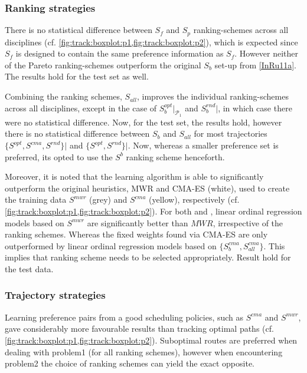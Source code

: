 \subsubsection{Ranking strategies}
There is no statistical difference between $S_f$ and $S_p$ ranking-schemes 
across all disciplines (cf. \cref{fig:track:boxplot:p1,fig:track:boxplot:p2}), 
which is expected since $S_f$ is designed to contain the same preference 
information as $S_f$. However neither of the Pareto ranking-schemes outperform 
the original $S_b$ set-up from \cref{InRu11a}. The results hold for the test 
set as well. 

Combining the ranking schemes, $S_{all}$, improves the individual ranking-schemes across all disciplines, except in the case of $S_b^{opt}\big|_{\mathcal{P_1}}$ and $S_b^{rnd}\big|$\!, in which case there were no statistical difference. Now, for the test set, the results hold, however there is no statistical difference between $S_b$ and $S_{all}$ for most trajectories $\{S^{opt},S^{cma},S^{rnd}\}\big|$\! and  $\{S^{opt},S^{rnd}\}\big|$\!. Now, whereas a smaller preference set is preferred, its opted to use the $S^{b}$ ranking scheme henceforth. 

Moreover, it is noted that the learning algorithm is able to significantly outperform the original heuristics, MWR and CMA-ES (white), used to create the training data $S^{mwr}$ (grey) and $S^{cma}$ (yellow), respectively (cf. \cref{fig:track:boxplot:p1,fig:track:boxplot:p2}). For both  and , linear ordinal regression models based on $S^{mwr}$ are significantly better than $MWR$, irrespective of the ranking schemes. Whereas the fixed weights found via CMA-ES are only outperformed by linear ordinal regression models based on $\{S_b^{cma},S_{all}^{cma}\}$. This implies that ranking scheme needs to be selected appropriately. Result hold for the test data.

\subsubsection{Trajectory strategies}
Learning preference pairs from a good scheduling policies, such as $S^{cma}$ and $S^{mwr}$, gave considerably more favourable results than tracking optimal paths (cf. \cref{fig:track:boxplot:p1,fig:track:boxplot:p2}). Suboptimal routes are preferred when dealing with problem{1} (for all ranking schemes), however when encountering problem{2} the choice of ranking schemes can yield the exact opposite.

